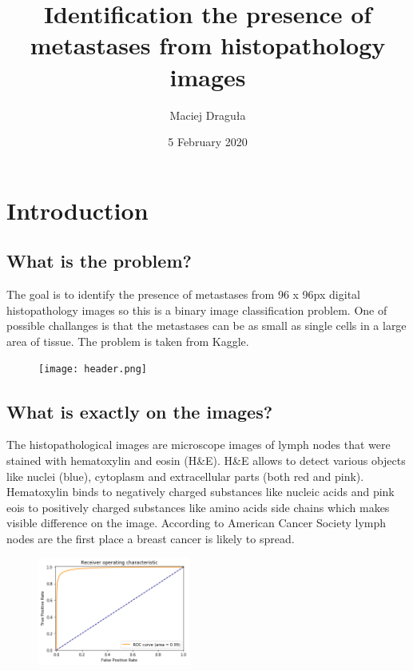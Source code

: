 \documentclass[12pt, a4paper]{article}
\begin{document}
\title{
	Identification the presence of metastases from histopathology images
}
	
\author{
	Maciej Draguła
}

\date{5 February 2020}


\maketitle

\section{Introduction}

\subsection*{What is the problem?}
\noindent
The goal is to identify the presence of metastases from 96 x 96px digital histopa\-thology images so this is a binary image classification problem. One of possible challanges is that the metastases can be as small as single cells in a large area of tissue. The problem is taken from Kaggle.

\begin{figure}[ht]
	\centering
	\texttt{[image: header.png]}
\end{figure}

\subsection*{What is exactly on the images?}

\noindent
The histopathological images are microscope images of lymph nodes that were stained with hematoxylin and eosin (H\&E). H\&E allows to detect various objects like nuclei (blue), cytoplasm and extracellular parts (both red and pink). Hematoxylin binds to negatively charged substances like nucleic acids and pink eois to positively charged substances like amino acids side chains which makes visible difference on the image. According to American Cancer Society lymph nodes are the first place a breast cancer is likely to spread.

\begin{figure}[ht]
	\centering
	\includegraphics[width =5cm]{roc.png}
\end{figure}
\end{document}
